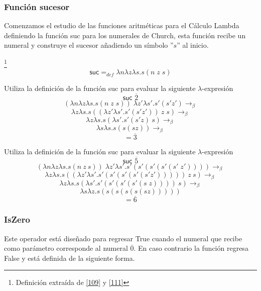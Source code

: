     \subsubsection{Función sucesor}
        Comenzamos el estudio de las funciones aritméticas para el Cálculo Lambda definiendo la función \textsf{suc} para los numerales de Church, esta función recibe un numeral y construye el sucesor añadiendo un símbolo ''$s$'' al inicio.
        \begin{definition}\footnote{Definición extraída de \hyperlink{109}{[109]} y  \hyperlink{111}{[111]}}
            $$\textsf{suc} =_{def} \lambda n\lambda z\lambda s. s(n \; z \; s)$$
        \end{definition}
     
        \begin{exercise}
            Utiliza la definición de la función \textsf{suc} para evaluar la siguiente  $\lambda$-expresión
            \[
                \textsf{suc } \overline{2}
            \]
            \[
                (\lambda n\lambda z\lambda s.s(n \; z \; s) ) \; \lambda z'\lambda s'.s'(s'z') \rightarrow_\beta 
            \]
		\[
			\lambda z\lambda s.s((\lambda z'\lambda s'.s'(s'z'))\ z \; s) \rightarrow_\beta 
		\]	
            \[
                 \lambda z\lambda s.s(\lambda s'.s'(s'z)\ s) \rightarrow_\beta
            \]
		\[
			\lambda s\lambda s.s(s(sz)) \rightarrow_\beta
		\]
            \[
                = \overline{3}
            \]
        \end{exercise}

        \begin{exercise}
            Utiliza la definición de la función \textsf{suc} para evaluar la siguiente  $\lambda$-expresión
            \[
                \textsf{suc } \overline{5}
            \]
            \[
                (\lambda n\lambda z\lambda s.s(n\ z\ s)) \; \lambda z'\lambda s'.s'(s'(s'(s'(s' \; z')))) \rightarrow_\beta
            \]
		\[
			 \lambda z\lambda s.s((\lambda z'\lambda s'.s'(s'(s'(s'(s'z')))))\ z\ s)  \rightarrow_\beta	
		\]
            \[
                \lambda z\lambda s.s(\lambda s'.s'(s'(s'(s'(s\;z))))\ s) \rightarrow_\beta 
            \]
		\[
			\lambda s\lambda z.s(s(s(s(s(sz)))))
		\]
            \[
                = \overline{6}
            \]
        \end{exercise}

        \subsubsection{IsZero}
        	Este operador está diseñado para regresar \textsf{True} cuando el numeral que recibe como parámetro corresponde al numeral $\overline{0}$. En caso contrario la función regresa \textsf{False} y está definida de la siguiente forma.
        
